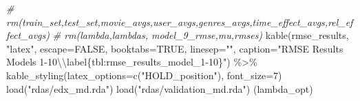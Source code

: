 \documentclass[
]{article}
\newenvironment{Shaded}{}{}
\newcommand{\AttributeTok}[1]{\textcolor[rgb]{0.49,0.56,0.16}{#1}}
\newcommand{\CommentTok}[1]{\textcolor[rgb]{0.38,0.63,0.69}{\textit{#1}}}
\newcommand{\ConstantTok}[1]{\textcolor[rgb]{0.53,0.00,0.00}{#1}}
\newcommand{\DecValTok}[1]{\textcolor[rgb]{0.25,0.63,0.44}{#1}}
\newcommand{\FunctionTok}[1]{\textcolor[rgb]{0.02,0.16,0.49}{#1}}
\newcommand{\NormalTok}[1]{#1}
\newcommand{\SpecialCharTok}[1]{\textcolor[rgb]{0.25,0.44,0.63}{#1}}
\newcommand{\StringTok}[1]{\textcolor[rgb]{0.25,0.44,0.63}{#1}}
\begin{document}
\begin{Shaded}
\begin{Highlighting}[]
\CommentTok{\# rm(train\_set,test\_set,movie\_avgs,user\_avgs,genres\_avgs,time\_effect\_avgs,rel\_effect\_avgs)}
\CommentTok{\# rm(lambda,lambdas, model\_9\_rmse,mu,rmses)}
  \FunctionTok{kable}\NormalTok{(rmse\_results, }\StringTok{"latex"}\NormalTok{, }\AttributeTok{escape=}\ConstantTok{FALSE}\NormalTok{, }\AttributeTok{booktabs=}\ConstantTok{TRUE}\NormalTok{, }\AttributeTok{linesep=}\StringTok{""}\NormalTok{, }\AttributeTok{caption=}\StringTok{"RMSE Results Models 1{-}10}\SpecialCharTok{\textbackslash{}\textbackslash{}}\StringTok{label\{tbl:rmse\_results\_model\_1{-}10\}"}\NormalTok{) }\SpecialCharTok{\%\textgreater{}\%}
    \FunctionTok{kable\_styling}\NormalTok{(}\AttributeTok{latex\_options=}\FunctionTok{c}\NormalTok{(}\StringTok{"HOLD\_position"}\NormalTok{), }\AttributeTok{font\_size=}\DecValTok{7}\NormalTok{)}
\FunctionTok{load}\NormalTok{(}\StringTok{"rdas/edx\_md.rda"}\NormalTok{)}
\FunctionTok{load}\NormalTok{(}\StringTok{"rdas/validation\_md.rda"}\NormalTok{)}
\NormalTok{(lambda\_opt)}


\end{Highlighting}
\end{Shaded}
\end{document}
